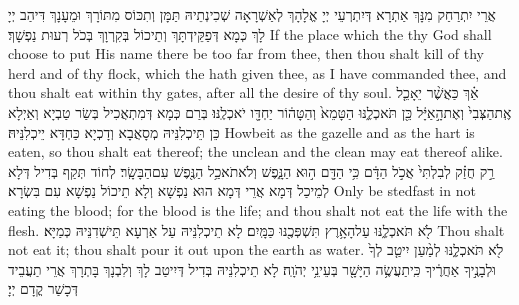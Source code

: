 {אֲרֵי יִתְרַחַק מִנָּךְ אַתְרָא דְּיִתְרְעֵי יְיָ אֱלָהָךְ לְאַשְׁרָאָה שְׁכִינְתֵיהּ תַּמָּן וְתִכּוֹס מִתּוֹרָךְ וּמֵעָנָךְ דִּיהַב יְיָ לָךְ כְּמָא דְּפַקֵּידְתָּךְ וְתֵיכוֹל בְּקִרְוָךְ בְּכֹל רְעוּת נַפְשָׁךְ׃}
{If the place which the \lord\space thy God shall choose to put His name there be too far from thee, then thou shalt kill of thy herd and of thy flock, which the \lord\space hath given thee, as I have commanded thee, and thou shalt eat within thy gates, after all the desire of thy soul.}{}
{אַ֗ךְ כַּאֲשֶׁ֨ר יֵאָכֵ֤ל אֶֽת\maqqaf הַצְּבִי֙ וְאֶת\maqqaf הָ֣אַיָּ֔ל כֵּ֖ן תֹּאכְלֶ֑נּוּ הַטָּמֵא֙ וְהַטָּה֔וֹר יַחְדָּ֖ו יֹאכְלֶֽנּוּ׃}
{בְּרַם כְּמָא דְּמִתְאֲכִיל בְּשַׂר טַבְיָא וְאַיְלָא כֵּן תֵּיכְלִנֵּיהּ מְסָאֲבָא וְדָכְיָא כַּחְדָּא יֵיכְלִנֵּיהּ׃}
{Howbeit as the gazelle and as the hart is eaten, so thou shalt eat thereof; the unclean and the clean may eat thereof alike.}{}
{רַ֣ק חֲזַ֗ק לְבִלְתִּי֙ אֲכֹ֣ל הַדָּ֔ם כִּ֥י הַדָּ֖ם ה֣וּא הַנָּ֑פֶשׁ וְלֹא\maqqaf תֹאכַ֥ל הַנֶּ֖פֶשׁ עִם\maqqaf הַבָּשָֽׂר׃}
{לְחוֹד תְּקַף בְּדִיל דְּלָא לְמֵיכַל דְּמָא אֲרֵי דְּמָא הוּא נַפְשָׁא וְלָא תֵיכוֹל נַפְשָׁא עִם בִּשְׂרָא׃}
{Only be stedfast in not eating the blood; for the blood is the life; and thou shalt not eat the life with the flesh.}{}
{לֹ֖א תֹּאכְלֶ֑נּוּ עַל\maqqaf הָאָ֥רֶץ תִּשְׁפְּכֶ֖נּוּ כַּמָּֽיִם׃}
{לָא תֵיכְלִנֵּיהּ עַל אַרְעָא תֵּישְׁדִנֵּיהּ כְּמַיָּא׃}
{Thou shalt not eat it; thou shalt pour it out upon the earth as water.}{}
{לֹ֖א תֹּאכְלֶ֑נּוּ לְמַ֨עַן יִיטַ֤ב לְךָ֙ וּלְבָנֶ֣יךָ אַחֲרֶ֔יךָ כִּֽי\maqqaf תַעֲשֶׂ֥ה הַיָּשָׁ֖ר בְּעֵינֵ֥י יְהֹוָֽה׃}
{לָא תֵיכְלִנֵּיהּ בְּדִיל דְּיִיטַב לָךְ וְלִבְנָךְ בָּתְרָךְ אֲרֵי תַעֲבֵיד דְּכָשַׁר קֳדָם יְיָ׃}
